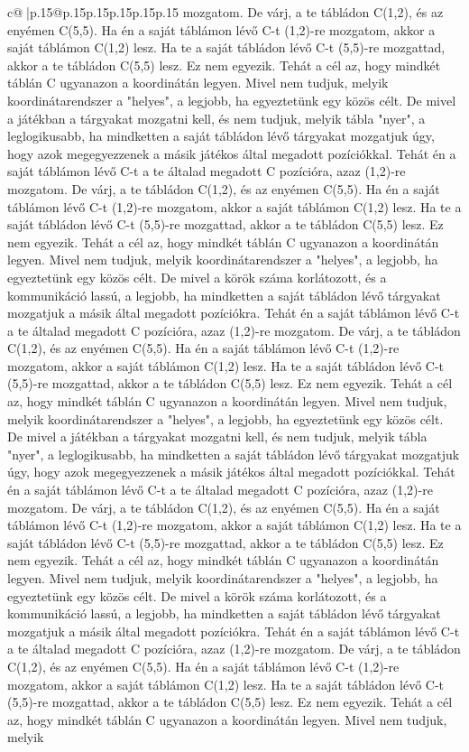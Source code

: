 \documentclass{article}
\begin{document}
{\begin{supertabular}{c@{$\;$}|p{.15\linewidth}@{}p{.15\linewidth}p{.15\linewidth}p{.15\linewidth}p{.15\linewidth}p{.15\linewidth}}
{{{mozgatom. De várj, a te tábládon C(1,2), és az enyémen C(5,5). Ha én a saját táblámon lévő C{-}t (1,2){-}re mozgatom, akkor a saját táblámon C(1,2) lesz. Ha te a saját tábládon lévő C{-}t (5,5){-}re mozgattad, akkor a te tábládon C(5,5) lesz. Ez nem egyezik. Tehát a cél az, hogy mindkét táblán C ugyanazon a koordinátán legyen. Mivel nem tudjuk, melyik koordinátarendszer a "helyes", a legjobb, ha egyeztetünk egy közös célt. De mivel a játékban a tárgyakat mozgatni kell, és nem tudjuk, melyik tábla "nyer", a leglogikusabb, ha mindketten a saját tábládon lévő tárgyakat mozgatjuk úgy, hogy azok megegyezzenek a másik játékos által megadott pozíciókkal. Tehát én a saját táblámon lévő C{-}t a te általad megadott C pozícióra, azaz (1,2){-}re mozgatom. De várj, a te tábládon C(1,2), és az enyémen C(5,5). Ha én a saját táblámon lévő C{-}t (1,2){-}re mozgatom, akkor a saját táblámon C(1,2) lesz. Ha te a saját tábládon lévő C{-}t (5,5){-}re mozgattad, akkor a te tábládon C(5,5) lesz. Ez nem egyezik. Tehát a cél az, hogy mindkét táblán C ugyanazon a koordinátán legyen. Mivel nem tudjuk, melyik koordinátarendszer a "helyes", a legjobb, ha egyeztetünk egy közös célt. De mivel a körök száma korlátozott, és a kommunikáció lassú, a legjobb, ha mindketten a saját tábládon lévő tárgyakat mozgatjuk a másik által megadott pozíciókra. Tehát én a saját táblámon lévő C{-}t a te általad megadott C pozícióra, azaz (1,2){-}re mozgatom. De várj, a te tábládon C(1,2), és az enyémen C(5,5). Ha én a saját táblámon lévő C{-}t (1,2){-}re mozgatom, akkor a saját táblámon C(1,2) lesz. Ha te a saját tábládon lévő C{-}t (5,5){-}re mozgattad, akkor a te tábládon C(5,5) lesz. Ez nem egyezik. Tehát a cél az, hogy mindkét táblán C ugyanazon a koordinátán legyen. Mivel nem tudjuk, melyik koordinátarendszer a "helyes", a legjobb, ha egyeztetünk egy közös célt. De mivel a játékban a tárgyakat mozgatni kell, és nem tudjuk, melyik tábla "nyer", a leglogikusabb, ha mindketten a saját tábládon lévő tárgyakat mozgatjuk úgy, hogy azok megegyezzenek a másik játékos által megadott pozíciókkal. Tehát én a saját táblámon lévő C{-}t a te általad megadott C pozícióra, azaz (1,2){-}re mozgatom. De várj, a te tábládon C(1,2), és az enyémen C(5,5). Ha én a saját táblámon lévő C{-}t (1,2){-}re mozgatom, akkor a saját táblámon C(1,2) lesz. Ha te a saját tábládon lévő C{-}t (5,5){-}re mozgattad, akkor a te tábládon C(5,5) lesz. Ez nem egyezik. Tehát a cél az, hogy mindkét táblán C ugyanazon a koordinátán legyen. Mivel nem tudjuk, melyik koordinátarendszer a "helyes", a legjobb, ha egyeztetünk egy közös célt. De mivel a körök száma korlátozott, és a kommunikáció lassú, a legjobb, ha mindketten a saját tábládon lévő tárgyakat mozgatjuk a másik által megadott pozíciókra. Tehát én a saját táblámon lévő C{-}t a te általad megadott C pozícióra, azaz (1,2){-}re mozgatom. De várj, a te tábládon C(1,2), és az enyémen C(5,5). Ha én a saját táblámon lévő C{-}t (1,2){-}re mozgatom, akkor a saját táblámon C(1,2) lesz. Ha te a saját tábládon lévő C{-}t (5,5){-}re mozgattad, akkor a te tábládon C(5,5) lesz. Ez nem egyezik. Tehát a cél az, hogy mindkét táblán C ugyanazon a koordinátán legyen. Mivel nem tudjuk, melyik }}}
\end{supertabular}}
\end{document}
